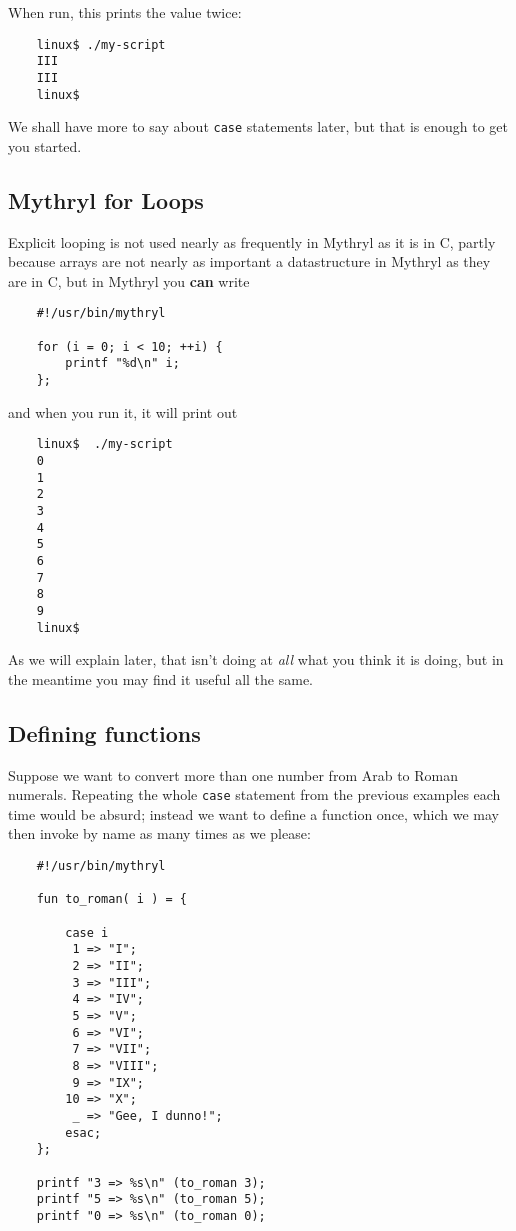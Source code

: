 When run, this prints the value twice:

\begin{verbatim}
    linux$ ./my-script
    III
    III
    linux$
\end{verbatim}

We shall have more to say about {\tt case} statements later, but that is 
enough to get you started.


\cutend*


\subsection{Mythryl for Loops}

Explicit looping is not used nearly as frequently in Mythryl as it is in C, 
partly because arrays are not nearly as important a datastructure in Mythryl 
as they are in C, but in Mythryl you {\bf can} write

\begin{verbatim}
    #!/usr/bin/mythryl

    for (i = 0; i < 10; ++i) {
        printf "%d\n" i;
    };
\end{verbatim}

and when you run it, it will print out

\begin{verbatim}
    linux$  ./my-script
    0
    1
    2
    3
    4
    5
    6
    7
    8
    9
    linux$
\end{verbatim}

As we will explain later, that isn't doing at {\it all} what you think it is doing, 
but in the meantime you may find it useful all the same.


\cutend*

\subsection{Defining functions}

Suppose we want to convert more than one number from Arab to Roman numerals. 
Repeating the whole {\tt case} statement from the previous examples each time 
would be absurd;  instead we want to define a function once, which we may 
then invoke by name as many times as we please:

\begin{verbatim}
    #!/usr/bin/mythryl

    fun to_roman( i ) = {

        case i
         1 => "I";
         2 => "II";
         3 => "III";
         4 => "IV";
         5 => "V";
         6 => "VI";
         7 => "VII";
         8 => "VIII";
         9 => "IX";
        10 => "X";
         _ => "Gee, I dunno!";
        esac;
    };

    printf "3 => %s\n" (to_roman 3);
    printf "5 => %s\n" (to_roman 5);
    printf "0 => %s\n" (to_roman 0);
\end{verbatim}


